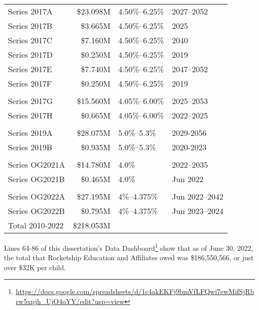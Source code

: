 \begin{table}[htp]
\begin{tabularx}{\textwidth}{lrll}
    Series 2017A     & \$23.098M & 4.50\%–6.25\%  & 2027–2052      \\
    Series 2017B     & \$3.665M  & 4.50\%–6.25\%  & 2025           \\
    Series 2017C     & \$7.160M  & 4.50\%–6.25\%  & 2040           \\
    Series 2017D     & \$0.250M  & 4.50\%–6.25\%  & 2019           \\
    Series 2017E     & \$7.740M  & 4.50\%–6.25\%  & 2047–2052      \\
    Series 2017F     & \$0.250M  & 4.50\%–6.25\%  & 2019           \\
                                                                   \\
    Series 2017G     & \$15.560M & 4.05\%–6.00\%  & 2025–2053      \\
    Series 2017H     & \$0.665M  &  4.05\%–6.00\% & 2022–2025      \\
                                                                   \\
    Series 2019A     & \$28.075M & 5.0\%–5.3\%    & 2029-2056      \\
    Series 2019B     & \$0.935M  & 5.0\%–5.3\%    & 2020-2023      \\
                                                                   \\
    Series OG2021A   & \$14.780M & 4.0\%          & 2022–2035      \\
    Series OG2021B   & \$0.465M  & 4.0\%          & Jun 2022       \\
                                                                   \\
    Series OG2022A   & \$27.195M & 4\%–4.375\%    & Jun 2022–2042  \\
    Series OG2022B   & \$0.795M  & 4\%–4.375\%    & Jun 2023–2024  \\
    \midrule
    Total 2010-2022  & \$218.053M                                  \\
    \bottomrule
  \end{tabularx}
\end{table}

Lines 64-86 of this dissertation's Data Dashboard\footnote{\url{https://docs.google.com/spreadsheets/d/1c4akEKFj9bmVfLFQwi7ewMifSjRbrw5xpjh_UjO4oYY/edit?usp=view}} show that as of June 30, 2022, the total that Rocketship Education and Affiliates owed was \$186,550,566, or just over \$32K per child.

